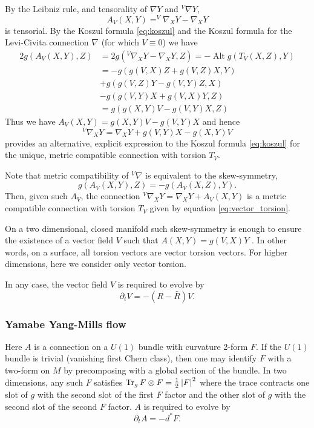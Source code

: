 \documentclass{amsart}
\begin{document}
By the Leibniz rule, and tensorality of \(\nabla Y\) and \(^{V}\nabla Y\),
\[
A_V(X, Y) = ^{V}\nabla_X Y - \nabla_X Y
\]
is tensorial. By the Koszul formula \eqref{eq:koszul} and the Koszul formula for the Levi-Civita connection \(\nabla\) (for which \(V \equiv 0\)) we have
\[
\begin{split}
2 g(A_V(X, Y), Z) &= 2 g(^{V}\nabla_X Y - \nabla_X Y, Z) = -\operatorname{Alt} g(T_V (X, Z), Y) \\
&= -g(g(V, X) Z + g(V, Z) X, Y) \\
&+ g(g(V, Z) Y - g(V, Y) Z, X) \\
&- g(g(V, Y) X + g(V, X) Y, Z) \\
&= g(g(X, Y)V - g(V, Y)X, Z)
\end{split}
\]
Thus we have $A_V(X, Y) = g(X, Y) V - g(V, Y) X$ and hence
\begin{equation}
\label{eq:vector_connection}
^{V}\nabla_X Y = \nabla_X Y + g(V, Y) X - g(X, Y) V
\end{equation}
provides an alternative, explicit expression to the Koszul formula \eqref{eq:koszul} for the unique, metric compatible connection with torsion \(T_V\).

Note that metric compatibility of $^{V}\nabla$ is equivalent to the skew-symmetry,
\[
g(A_V(X, Y), Z) = - g(A_V(X, Z), Y).
\]
Then, given such \(A_V\), the connection \(^{V}\nabla_X Y = \nabla_X Y + A_V(X, Y)\) is a metric compatible connection with torsion \(T_V\) given by equation \eqref{eq:vector_torsion}.

\begin{rem}
On a two dimensional, closed manifold such skew-symmetry is enough to ensure the existence of a vector field \(V\) such that \(A(X, Y) = g(V, X)Y\) \cite[Theorem 3.1]{MR712664}. In other words, on a surface, all torsion vectors are vector torsion vectors. For higher dimensions, here we consider only vector torsion.
\end{rem}

In any case, the vector field \(V\) is required to evolve by
\[
\partial_t V = -(R - \bar{R}) V.
\]

\subsubsection*{Yamabe Yang-Mills flow}

Here \(A\) is a connection on a \(U(1)\) bundle with curvature 2-form \(F\). If the \(U(1)\) bundle is trivial (vanishing first Chern class), then one may identify \(F\) with a two-form on \(M\) by precomposing with a global section of the bundle. In two dimensions, any such \(F\) satisfies \(\operatorname{Tr}_g F \otimes F = \tfrac{1}{2} \left|{F}\right|^2\) where the trace contracts one slot of \(g\) with the second slot of the first \(F\) factor and the other slot of \(g\) with the second slot of the second \(F\) factor. \(A\) is required to evolve by
\[
\partial_t A = -d^{\ast} F.
\]
\end{document}
